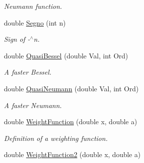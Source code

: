 \begin{DoxyCompactItemize}
\begin{DoxyCompactList}\small\item\em \-Neumann function. \end{DoxyCompactList}\item 
\hypertarget{classMatematica_a3ea54c21e1dfc6cb0108483eca97f7cd}{double \hyperlink{classMatematica_a3ea54c21e1dfc6cb0108483eca97f7cd}{\-Segno} (int n)}\label{classMatematica_a3ea54c21e1dfc6cb0108483eca97f7cd}

\begin{DoxyCompactList}\small\item\em \-Sign of -\/$^\wedge$n. \end{DoxyCompactList}\item 
\hypertarget{classMatematica_af5ab240211f6f0aeada6022a32585acb}{double \hyperlink{classMatematica_af5ab240211f6f0aeada6022a32585acb}{\-Quasi\-Bessel} (double \-Val, int \-Ord)}\label{classMatematica_af5ab240211f6f0aeada6022a32585acb}

\begin{DoxyCompactList}\small\item\em \-A faster \-Bessel. \end{DoxyCompactList}\item 
\hypertarget{classMatematica_abee4e33f52ba1babbe9d2422e835ece5}{double \hyperlink{classMatematica_abee4e33f52ba1babbe9d2422e835ece5}{\-Quasi\-Neumann} (double \-Val, int \-Ord)}\label{classMatematica_abee4e33f52ba1babbe9d2422e835ece5}

\begin{DoxyCompactList}\small\item\em \-A faster \-Neumann. \end{DoxyCompactList}\item 
\hypertarget{classMatematica_a8ffbe3b65717720f6a91536c9be08c12}{double \hyperlink{classMatematica_a8ffbe3b65717720f6a91536c9be08c12}{\-Weight\-Function} (double x, double a)}\label{classMatematica_a8ffbe3b65717720f6a91536c9be08c12}

\begin{DoxyCompactList}\small\item\em \-Definition of a weighting function. \end{DoxyCompactList}\item 
\hypertarget{classMatematica_a3381e7982dc433288e7ddac251a8e995}{double \hyperlink{classMatematica_a3381e7982dc433288e7ddac251a8e995}{\-Weight\-Function2} (double x, double a)}\label{classMatematica_a3381e7982dc433288e7ddac251a8e995}


\end{DoxyCompactItemize}
